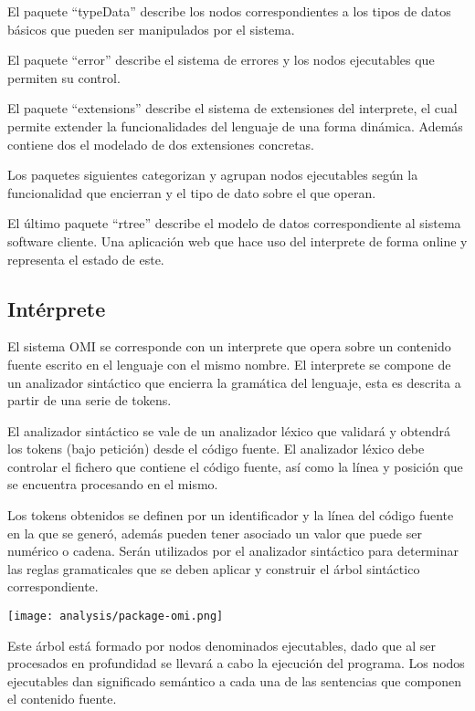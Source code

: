 El paquete ``typeData'' describe los nodos correspondientes a los tipos de datos básicos 
que pueden ser manipulados por el sistema. 

\begin{multicols}{2}
El paquete ``error'' describe el sistema de errores y los nodos ejecutables que permiten
su control.

El paquete ``extensions'' describe el sistema de extensiones del interprete, el cual
permite extender la funcionalidades del lenguaje de una forma dinámica. Además contiene dos
el modelado de dos extensiones concretas.  

Los paquetes siguientes categorizan y agrupan nodos ejecutables según la funcionalidad 
que encierran y el tipo de dato sobre el que operan. 

El último paquete ``rtree'' describe el modelo de datos correspondiente al sistema 
software cliente. Una aplicación web que hace uso del interprete de forma online
y representa el estado de este.
\subsection{Intérprete}
El sistema OMI se corresponde con un interprete que opera sobre 
un contenido fuente escrito en el lenguaje con el mismo nombre. 
El interprete se compone de un analizador sintáctico que encierra la 
gramática del lenguaje, esta es descrita a partir de una serie de tokens.

El analizador sintáctico se vale de un analizador léxico que validará 
y obtendrá los tokens (bajo petición) desde el código fuente.
El analizador léxico debe controlar el fichero que contiene el código fuente, 
así como la línea y posición que se encuentra procesando en el mismo.

Los tokens obtenidos se definen por un identificador y la línea del código fuente en la que se generó,
además pueden tener asociado un valor que puede ser numérico o cadena. Serán utilizados 
por el analizador sintáctico para determinar las reglas gramaticales que se deben aplicar y
construir el árbol sintáctico correspondiente. 
\columnbreak 
\begin{center}
\texttt{[image: analysis/package-omi.png]}
\end{center}
\end{multicols}
\pagebreak
Este árbol está formado 
por nodos denominados ejecutables, dado que al ser procesados en profundidad se llevará 
a cabo la ejecución del programa. Los nodos ejecutables dan significado semántico a 
cada una de las sentencias que componen el contenido fuente.

